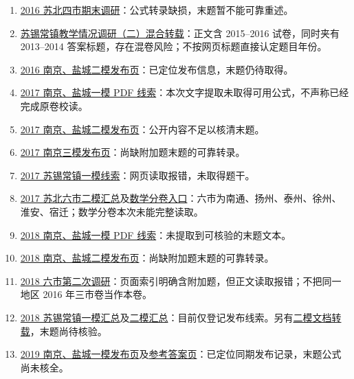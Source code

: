 \documentclass[UTF8,12pt,a4paper,fontset=fandol]{ctexart}
\begin{document}
\begin{enumerate}
\item \href{https://max.book118.com/html/2016/0412/40228345.shtm}{2016 苏北四市期末调研}：公式转录缺损，末题暂不能可靠重述。
\item \href{https://www.renrendoc.com/paper/195156858.html}{苏锡常镇教学情况调研（二）混合转载}：正文含 2015--2016 试卷，同时夹有 2013--2014 答案标题，存在混卷风险；不按网页标题直接认定题目年份。
\item \href{https://gaokao.eol.cn/shiti/moniti/201603/t20160325_1380484.shtml}{2016 南京、盐城二模发布页}：已定位发布信息，末题仍待取得。
\item \href{https://imgs.app.gaokaozhitongche.com/resource/pdf/paper/202305/20230504165103_LpudIQ.pdf}{2017 南京、盐城一模 PDF 线索}：本次文字提取未取得可用公式，不声称已经完成原卷校读。
\item \href{https://app.gaokaozhitongche.com/news/10648}{2017 南京、盐城二模发布页}：公开内容不足以核清末题。
\item \href{https://gaokao.eol.cn/shiti/sx/201705/t20170510_1514413.shtml}{2017 南京三模发布页}：尚缺附加题末题的可靠转录。
\item \href{https://www.renjiaoshe.com/gaozhongshuxue/yilun/172495.html}{2017 苏锡常镇一模线索}：网页读取报错，未取得题干。
\item \href{https://news.koolearn.com/20170324/1115209.html}{2017 苏北六市二模汇总}及\href{https://news.koolearn.com/20170323/1115099.html}{数学分卷入口}：六市为南通、扬州、泰州、徐州、淮安、宿迁；数学分卷本次未能完整读取。
\item \href{https://imgs.app.gaokaozhitongche.com/resource/pdf/paper/202305/20230505003302_0So7fy.pdf}{2018 南京、盐城一模 PDF 线索}：未提取到可核验的末题文本。
\item \href{https://news.koolearn.com/20180321/1146694_2.html}{2018 南京、盐城二模发布页}：尚缺附加题末题的可靠转录。
\item \href{https://www.renjiaoshe.com/gaozhongshuxue/erlun/508681.html}{2018 六市第二次调研}：页面索引明确含附加题，但正文读取报错；不把同一地区 2016 年三市卷当作本卷。
\item \href{https://news.koolearn.com/20180320/1146651.html}{2018 苏锡常镇一模汇总}及\href{https://news.koolearn.com/20180503/1149614.html}{二模汇总}：目前仅登记发布线索。另有\href{https://max.book118.com/html/2019/0914/7103142025002055.shtm}{二模文档转载}，末题尚待核验。
\item \href{https://m.koolearn.com/news/20190115/1167775.html}{2019 南京、盐城一模发布页}及\href{https://zj.qinxue100.com/news/gz/112567.html}{参考答案页}：已定位同期发布记录，末题公式尚未核全。

\end{enumerate}
\end{document}
